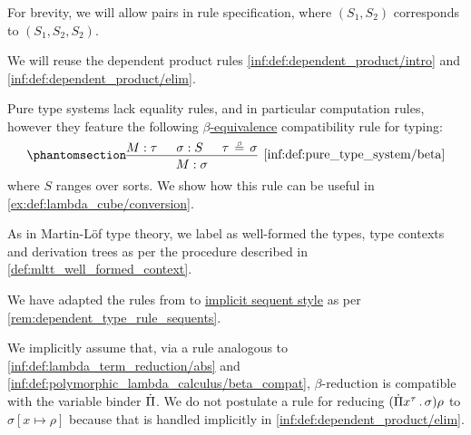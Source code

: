 \begin{definition}
\begin{thmenum}
    For brevity, we will allow pairs in rule specification, where \( (S_1, S_2) \) corresponds to \( (S_1, S_2, S_2) \).
  \end{thmenum}

  We will reuse the dependent product rules \ref{inf:def:dependent_product/intro} and \ref{inf:def:dependent_product/elim}.

  Pure type systems lack equality rules, and in particular computation rules, however they feature the following \hyperref[def:typed_term_reduction]{\( \beta \)-equivalence} compatibility rule for typing:
  \begin{equation*}\taglabel[\ensuremath{ \logic{Conv} }]{inf:def:pure_type_system/beta}
    \begin{prooftree}
      \hypo{ M: \tau }
      \hypo{ \sigma: S }
      \hypo{ \tau \equivrel{\beta} \sigma }
      \infer3[\ref{inf:def:pure_type_system/beta}]{ M: \sigma },
    \end{prooftree}
  \end{equation*}
  where \( S \) ranges over sorts. We show how this rule can be useful in \cref{ex:def:lambda_cube/conversion}.

  As in Martin-L\"of type theory, we label as well-formed the types, type contexts and derivation trees as per the procedure described in \cref{def:mltt_well_formed_context}.
\end{definition}
\begin{comments}
  \item We have adapted the rules from \cite[\S 5.2]{Barendregt1992LambdaCalculiWithTypes} to \hyperref[rem:natural_deduction_explicit_sequents]{implicit sequent style} as per \cref{rem:dependent_type_rule_sequents}.

  \item We implicitly assume that, via a rule analogous to \ref{inf:def:lambda_term_reduction/abs} and \ref{inf:def:polymorphic_lambda_calculus/beta_compat}, \( \beta \)-reduction is compatible with the variable binder \( \dot{\Pi} \). We do not postulate a rule for reducing \( (\qprod {x^\tau} \sigma) \rho \) to \( \sigma[x \mapsto \rho] \) because that is handled implicitly in \ref{inf:def:dependent_product/elim}.
\end{comments}

